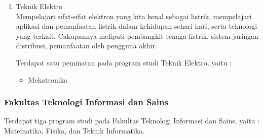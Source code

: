 \begin{enumerate}
		\item Teknik Elektro\\
			Mempelajari sifat-sifat elektron yang kita kenal sebagai listrik, mempelajari aplikasi dan pemanfaatan listrik dalam kehidupan sehari-hari, serta teknologi yang terkait. Cakupannya meliputi pembangkit tenaga listrik, sistem jaringan distribusi, pemanfaatan oleh pengguna akhir.
			
			Terdapat satu peminatan pada program studi Teknik Elektro, yaitu :
			
			\begin{itemize}
				\item Mekatronika
			\end{itemize}\leavevmode

	\end{enumerate}
	
\subsubsection{Fakultas Teknologi Informasi dan Sains}
Terdapat tiga program studi pada Fakultas Teknologi Informasi dan Sains, yaitu : Matematika, Fisika, dan Teknik Informatika.
	

